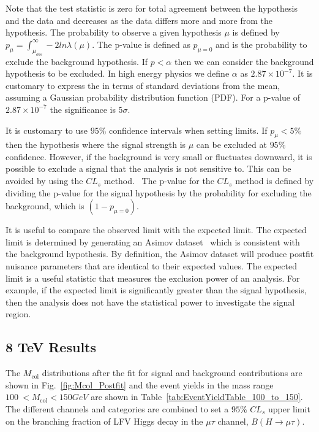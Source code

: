 \qquad Note that the test statistic is zero for total agreement between the hypothesis and the data and decreases as the data differs more and more from the hypothesis. The probability to observe a given hypothesis $\mu$ is defined by $p_{\mu} = \int_{\mu_{obs}}^{\infty} - 2 ln \lambda(\mu)$. The p-value is defined as $p_{\mu=0}$ and is the probability to exclude the background hypothesis. If $p<\alpha$ then we can consider the background hypothesis to be excluded. In high energy physics we define $\alpha$ as $2.87 \times 10^{-7}$. It is customary to express the in terms of standard deviations from the mean, assuming a Gaussian probability distribution function (PDF). For a p-value of $2.87 \times 10^{-7}$ the significance is 5$\sigma$. 

\qquad It is customary to use $95\%$ confidence intervals when setting limits. If $p_{\mu} < 5\%$ then the hypothesis where the signal strength is $\mu$ can be excluded at $95\%$ confidence. However, if the background is very small or fluctuates downward, it is possible to exclude a signal that the analysis is not sensitive to. This can be avoided by using the $CL_{s}$ method.~\cite{Read:451614} The p-value for the $CL_{s}$ method is defined by dividing the p-value for the signal hypothesis by the probability for excluding the background, which is $(1-p_{\mu=0})$.

\qquad It is useful to compare the observed limit with the expected limit. The expected limit is determined by generating an Asimov dataset~\cite{Cowan:2010js} which is consistent with the background hypothesis. By definition, the Asimov dataset will produce postfit nuisance parameters that are identical to their expected values. The expected limit is a useful statistic that measures the exclusion power of an analysis. For example, if the expected limit is significantly greater than the signal hypothesis, then the analysis does not have the statistical power to investigate the signal region. 


\subsection{8 TeV Results}
The $M_\text{col}$ distributions after the fit for signal and background contributions are shown in Fig.~\ref{fig:Mcol_Postfit} and the
event yields in the mass range $100\:  < M_\text{col} < 150GeV$ are shown in Table~\ref{tab:EventYieldTable_100_to_150}.
The different channels and categories are combined  to set a $95\%$ $CL_{s}$  upper limit on the branching
fraction of LFV Higgs decay in the  $\mu \tau$ channel, $B(H\rightarrow\mu\tau)$.

